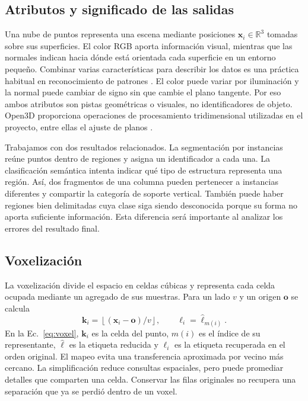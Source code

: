 \documentclass[journal,onecolumn]{IEEEtran}
\begin{document}
\subsection{Atributos y significado de las salidas}
Una nube de puntos representa una escena mediante posiciones $\mathbf{x}_i\in\mathbb{R}^3$ tomadas sobre sus superficies. El color RGB aporta información visual, mientras que las normales indican hacia dónde está orientada cada superficie en un entorno pequeño. Combinar varias características para describir los datos es una práctica habitual en reconocimiento de patrones \cite{bishop,muller}. El color puede variar por iluminación y la normal puede cambiar de signo sin que cambie el plano tangente. Por eso ambos atributos son pistas geométricas o visuales, no identificadores de objeto. Open3D proporciona operaciones de procesamiento tridimensional utilizadas en el proyecto, entre ellas el ajuste de planos \cite{open3d}.

Trabajamos con dos resultados relacionados. La segmentación por instancias reúne puntos dentro de regiones y asigna un identificador a cada una. La clasificación semántica intenta indicar qué tipo de estructura representa una región. Así, dos fragmentos de una columna pueden pertenecer a instancias diferentes y compartir la categoría de soporte vertical. También puede haber regiones bien delimitadas cuya clase siga siendo desconocida porque su forma no aporta suficiente información. Esta diferencia será importante al analizar los errores del resultado final.

\subsection{Voxelización}
La voxelización divide el espacio en celdas cúbicas y representa cada celda ocupada mediante un agregado de sus muestras. Para un lado $v$ y un origen $\mathbf{o}$ se calcula
\begin{equation}\mathbf{k}_i=\left\lfloor(\mathbf{x}_i-\mathbf{o})/v\right\rfloor,\qquad \ell_i=\widehat{\ell}_{m(i)}.\label{eq:voxel}\end{equation}
En la Ec.~\eqref{eq:voxel}, $\mathbf{k}_i$ es la celda del punto, $m(i)$ es el índice de su representante, $\widehat{\ell}$ es la etiqueta reducida y $\ell_i$ es la etiqueta recuperada en el orden original. El mapeo evita una transferencia aproximada por vecino más cercano. La simplificación reduce consultas espaciales, pero puede promediar detalles que comparten una celda. Conservar las filas originales no recupera una separación que ya se perdió dentro de un voxel.
\end{document}
